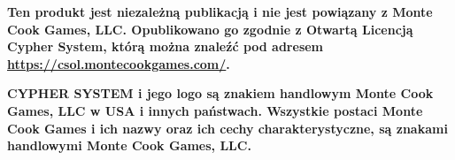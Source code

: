 \documentclass[10pt, a4paper, twocolumn, openright]{book}
\begin{document}




\newpage

\onecolumn

\vspace*{\fill}

{\large \textbf{Ten produkt jest niezależną publikacją i nie jest powiązany z Monte Cook Games, LLC. Opublikowano go zgodnie z Otwartą Licencją Cypher System, którą można znaleźć pod adresem \url{https://csol.montecookgames.com/}.}}

\vspace{1cm}

{\large \textbf{CYPHER SYSTEM i jego logo są znakiem handlowym Monte Cook Games, LLC w USA i innych państwach. Wszystkie postaci Monte Cook Games i ich nazwy oraz ich cechy charakterystyczne, są znakami handlowymi Monte Cook Games, LLC.}}
\end{document}
